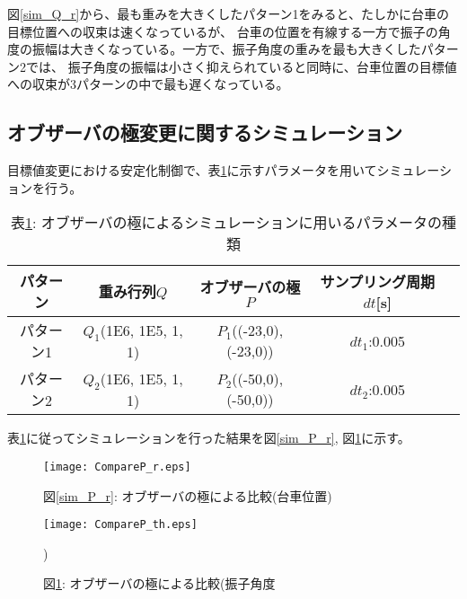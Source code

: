図\ref{sim_Q_r}から、最も重みを大きくしたパターン1をみると、たしかに台車の目標位置への収束は速くなっているが、
台車の位置を有線する一方で振子の角度の振幅は大きくなっている。一方で、振子角度の重みを最も大きくしたパターン2では、
振子角度の振幅は小さく抑えられていると同時に、台車位置の目標値への収束が3パターンの中で最も遅くなっている。

\subsection{オブザーバの極変更に関するシミュレーション}
目標値変更における安定化制御で、表\ref{sim_P}に示すパラメータを用いてシミュレーションを行う。

\begin{table}[htbp]
    \begin{center}
        \caption{表\ref{sim_P}: オブザーバの極によるシミュレーションに用いるパラメータの種類}
        \begin{tabular}{|c|c|c|c|c|} \hline
            パターン & 重み行列$Q$ & オブザーバの極$P$ & サンプリング周期$dt$[s] \\ \hline \hline
            パターン1 & $Q_1$(1E6, 1E5, 1, 1) & $P_1$((-23,0), (-23,0)) & $dt_1$:0.005 \\ \hline
            パターン2 & $Q_2$(1E6, 1E5, 1, 1) & $P_2$((-50,0), (-50,0)) & $dt_2$:0.005 \\ \hline
        \end{tabular}
        \label{sim_P}
    \end{center}
\end{table}

表\ref{sim_P}に従ってシミュレーションを行った結果を図\ref{sim_P_r}, 図\ref{sim_P_th}に示す。

\begin{figure}[htbp]
    \begin{minipage}{0.5\hsize}
        \begin{center}
            \texttt{[image: CompareP\_r.eps]}
            \caption{図\ref{sim_P_r}: オブザーバの極による比較(台車位置)}
            \label{sim_P_r}
        \end{center}
    \end{minipage}
    \begin{minipage}{0.5\hsize}
        \begin{center}
            \texttt{[image: CompareP\_th.eps]}
            \caption{図\ref{sim_P_th}: オブザーバの極による比較(振子角度})
            \label{sim_P_th}
        \end{center}
    \end{minipage}
\end{figure}

